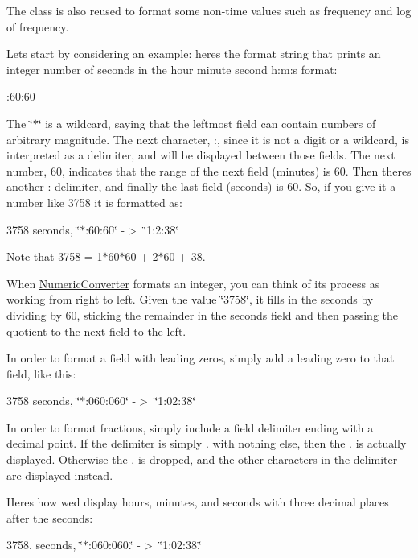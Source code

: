 The class is also reused to format some non-\/time values such as frequency and log of frequency.

Let\textquotesingle{}s start by considering an example\+: here\textquotesingle{}s the format string that prints an integer number of seconds in the hour minute second h\+:m\+:s format\+:

\+:60\+:60

The \char`\"{}$\ast$\char`\"{} is a wildcard, saying that the leftmost field can contain numbers of arbitrary magnitude. The next character, \textquotesingle{}\+:\textquotesingle{}, since it is not a digit or a wildcard, is interpreted as a delimiter, and will be displayed between those fields. The next number, 60, indicates that the range of the next field (minutes) is 60. Then there\textquotesingle{}s another \textquotesingle{}\+:\textquotesingle{} delimiter, and finally the last field (seconds) is 60. So, if you give it a number like 3758 it is formatted as\+:

3758 seconds, \char`\"{}$\ast$\+:60\+:60\char`\"{} -\/$>$ \char`\"{}1\+:2\+:38\char`\"{}

Note that 3758 = 1$\ast$60$\ast$60 + 2$\ast$60 + 38.

When \hyperlink{class_numeric_converter}{Numeric\+Converter} formats an integer, you can think of its process as working from right to left. Given the value \char`\"{}3758\char`\"{}, it fills in the seconds by dividing by 60, sticking the remainder in the seconds field and then passing the quotient to the next field to the left.

In order to format a field with leading zeros, simply add a leading zero to that field, like this\+:

3758 seconds, \char`\"{}$\ast$\+:060\+:060\char`\"{} -\/$>$ \char`\"{}1\+:02\+:38\char`\"{}

In order to format fractions, simply include a field delimiter ending with a decimal point. If the delimiter is simply \textquotesingle{}.\textquotesingle{} with nothing else, then the \textquotesingle{}.\textquotesingle{} is actually displayed. Otherwise the \textquotesingle{}.\textquotesingle{} is dropped, and the other characters in the delimiter are displayed instead.

Here\textquotesingle{}s how we\textquotesingle{}d display hours, minutes, and seconds with three decimal places after the seconds\+:

3758. seconds, \char`\"{}$\ast$\+:060\+:060.\char`\"{} -\/$>$ \char`\"{}1\+:02\+:38.\char`\"{}

